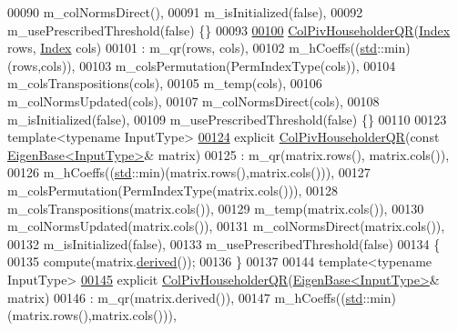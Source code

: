 \begin{DoxyCode}
00090         m\_colNormsDirect(),
00091         m\_isInitialized(false),
00092         m\_usePrescribedThreshold(false) \{\}
00093 
\hyperlink{group___q_r___module_a5965d4fdebc04b2df71d67ff0b2d0c2c}{00100}     \hyperlink{group___q_r___module_a5965d4fdebc04b2df71d67ff0b2d0c2c}{ColPivHouseholderQR}(\hyperlink{namespace_eigen_a62e77e0933482dafde8fe197d9a2cfde}{Index} rows, \hyperlink{namespace_eigen_a62e77e0933482dafde8fe197d9a2cfde}{Index} cols)
00101       : m\_qr(rows, cols),
00102         m\_hCoeffs((\hyperlink{namespacestd}{std}::min)(rows,cols)),
00103         m\_colsPermutation(PermIndexType(cols)),
00104         m\_colsTranspositions(cols),
00105         m\_temp(cols),
00106         m\_colNormsUpdated(cols),
00107         m\_colNormsDirect(cols),
00108         m\_isInitialized(false),
00109         m\_usePrescribedThreshold(false) \{\}
00110 
00123     \textcolor{keyword}{template}<\textcolor{keyword}{typename} InputType>
\hyperlink{group___q_r___module_a1aa6a5b95380df0ceb224cb833316d4f}{00124}     \textcolor{keyword}{explicit} \hyperlink{group___q_r___module_a1aa6a5b95380df0ceb224cb833316d4f}{ColPivHouseholderQR}(\textcolor{keyword}{const} \hyperlink{group___core___module_struct_eigen_1_1_eigen_base}{EigenBase<InputType>}& matrix)
00125       : m\_qr(matrix.rows(), matrix.cols()),
00126         m\_hCoeffs((\hyperlink{namespacestd}{std}::min)(matrix.rows(),matrix.cols())),
00127         m\_colsPermutation(PermIndexType(matrix.cols())),
00128         m\_colsTranspositions(matrix.cols()),
00129         m\_temp(matrix.cols()),
00130         m\_colNormsUpdated(matrix.cols()),
00131         m\_colNormsDirect(matrix.cols()),
00132         m\_isInitialized(false),
00133         m\_usePrescribedThreshold(false)
00134     \{
00135       compute(matrix.\hyperlink{group___core___module_a324b16961a11d2ecfd2d1b7dd7946545}{derived}());
00136     \}
00137 
00144     \textcolor{keyword}{template}<\textcolor{keyword}{typename} InputType>
\hyperlink{group___q_r___module_a65782010a93a4c9ef4a9191ac8fe30bc}{00145}     \textcolor{keyword}{explicit} \hyperlink{group___q_r___module_a65782010a93a4c9ef4a9191ac8fe30bc}{ColPivHouseholderQR}(\hyperlink{group___core___module_struct_eigen_1_1_eigen_base}{EigenBase<InputType>}& matrix)
00146       : m\_qr(matrix.derived()),
00147         m\_hCoeffs((\hyperlink{namespacestd}{std}::min)(matrix.rows(),matrix.cols())),

\end{DoxyCode}
